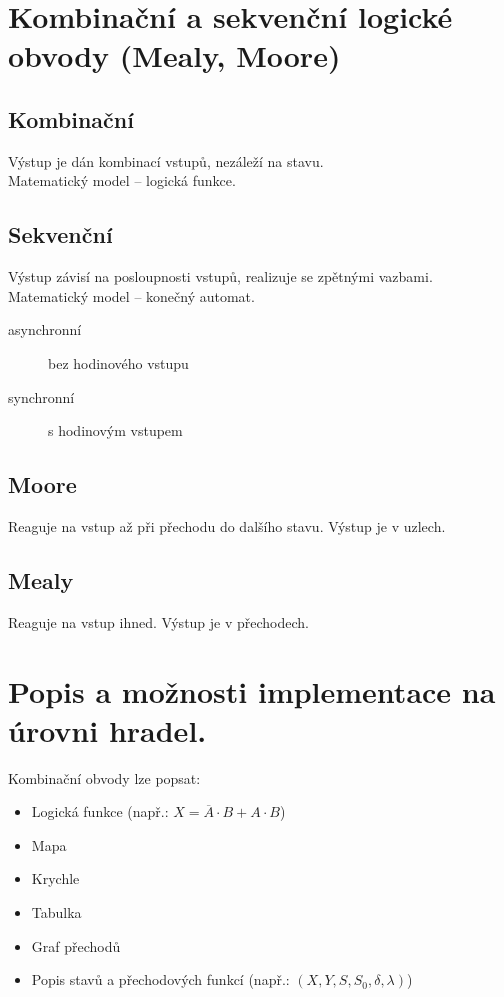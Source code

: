 \documentclass{szzclass}
\begin{document}
\section{Kombinační a sekvenční logické obvody (Mealy, Moore)}
\subsection{Kombinační}
Výstup je dán kombinací vstupů, nezáleží na stavu. \\
Matematický model -- logická funkce.
\subsection{Sekvenční}
Výstup závisí na posloupnosti vstupů, realizuje se zpětnými vazbami. \\
Matematický model -- konečný automat.
\begin{description}
\item[asynchronní] bez hodinového vstupu
\item[synchronní] s hodinovým vstupem
\end{description}

\subsection{Moore}
Reaguje na vstup až při přechodu do dalšího stavu. Výstup je v uzlech.

\subsection{Mealy}
Reaguje na vstup ihned. Výstup je v přechodech.

\section{Popis a možnosti implementace na úrovni hradel.}
Kombinační obvody lze popsat:
\begin{itemize}
  \item Logická funkce (např.: $X = \overline{A}\cdot B + A\cdot B$)
  \item Mapa
  \item Krychle
  \item Tabulka
  \item Graf přechodů
  \item Popis stavů a přechodových funkcí (např.: $(X,Y,S,S_0,\delta,\lambda)$)
\end{itemize}
\end{document}
